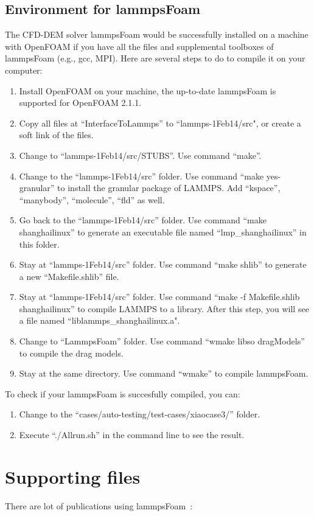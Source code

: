 \documentclass[11pt]{article}
\begin{document}
\subsection{Environment for lammpsFoam}
The CFD-DEM solver lammpsFoam would be successfully installed on a machine with OpenFOAM if you have
all the files and supplemental toolboxes of lammpsFoam (e.g., gcc, MPI). Here are several steps to
do to compile it on your computer:
\begin{enumerate}
    \item Install OpenFOAM on your machine, the up-to-date lammpsFoam is supported for OpenFOAM
    2.1.1.
    \item Copy all files at ``InterfaceToLammps'' to ``lammps-1Feb14/src", or create a soft link of the
    files.
    \item Change to ``lammps-1Feb14/src/STUBS''. Use command ``make''.
    \item Change to the ``lammps-1Feb14/src'' folder. Use command ``make yes-granular'' to install the
    granular package of LAMMPS. Add ``kspace'', ``manybody'', ``molecule'', ``fld'' as well.
    \item Go back to the ``lammps-1Feb14/src'' folder. Use command ``make shanghailinux'' to generate an
    executable file named ``lmp\_shanghailinux'' in this folder.
    \item Stay at ``lammps-1Feb14/src'' folder. Use command ``make shlib'' to generate a new
    ``Makefile.shlib'' file.
    \item Stay at ``lammps-1Feb14/src'' folder. Use command ``make -f Makefile.shlib shanghailinux'' to compile
    LAMMPS to a library. After this step, you will see a file named ``liblammps\_shanghailinux.a".
    \item Change to ``LammpsFoam'' folder. Use command ``wmake libso dragModels'' to compile the drag
    models.
    \item Stay at the same directory. Use command ``wmake'' to compile lammpsFoam.
\end{enumerate}

To check if your lammpsFoam is succesfully compiled, you can:
\begin{enumerate}
    \item Change to the ``cases/auto-testing/test-cases/xiaocase3/'' folder. 
    \item Execute ``./Allrun.sh'' in the command line to see the result.
\end{enumerate}

\section{Supporting files}

There are lot of publications using
lammpsFoam~\cite{sun09,xiao-cicp,gupta11a,gupta11b,gupta11b,gxs11a,gupta13a,gupta12,part1,part2}:



\end{document}

